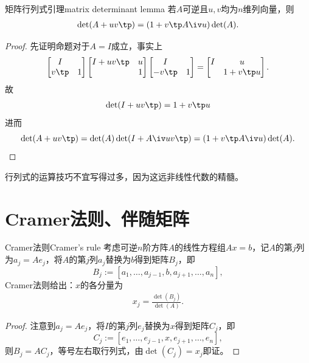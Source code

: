 \begin{theorem}
	{矩阵行列式引理}{matrix determinant lemma}
	若$A$可逆且$u,v$均为$n$维列向量，则
	\begin{align}
		\det(A+uv\tp)=(1+v\tp A\iv u)\det(A).
	\end{align}
\end{theorem}
\begin{proof}
	先证明命题对于$A=I$成立，事实上
	\begin{align*}
		\begin{bmatrix}
			I\\v\tp&1
		\end{bmatrix}
		\begin{bmatrix}
			I+uv\tp&u\\ &1
		\end{bmatrix}
		\begin{bmatrix}
			I\\-v\tp&1
		\end{bmatrix}=
		\begin{bmatrix}
			I&u\\ &1+v\tp u
		\end{bmatrix}.
	\end{align*}
	故
	\begin{align}
		\det(I+uv\tp)=1+v\tp u
	\end{align}
	进而 
	\[
		\det(A+uv\tp)=\det(A)\det(I+A\iv uv\tp)=(1+v\tp A\iv u)\det(A).
		\qedhere
	\]
\end{proof}
\begin{remark}
	行列式的运算技巧不宜写得过多，因为这远非线性代数的精髓。
\end{remark}
\section{Cramer法则、伴随矩阵}
\begin{theorem}{Cramer法则}{Cramer's rule}
	考虑可逆$n$阶方阵$A$的线性方程组$Ax=b$，记$A$的第$j$列为$a_j=Ae_j$，将$A$的第$j$列$a_j$替换为$b$得到矩阵$B_j$，即
	\[
		B_j:=[a_1,\ldots,a_{j-1},b,a_{j+1},\ldots,a_n],
	\]
	Cramer法则给出：$x$的各分量为
	\begin{align}
		x_j=\frac{\det(B_j)}{\det(A)}.
	\end{align}
\end{theorem}

\begin{proof}
	注意到$a_j=Ae_j$，将$I$的第$j$列$e_j$替换为$x$得到矩阵$C_j$，即
	\[
		C_j:=[e_1,\ldots,e_{j-1},x,e_{j+1},\ldots,e_n],
	\]
	则$B_j=AC_j$，等号左右取行列式，由$\det(C_j)=x_j$即证。
\end{proof}

